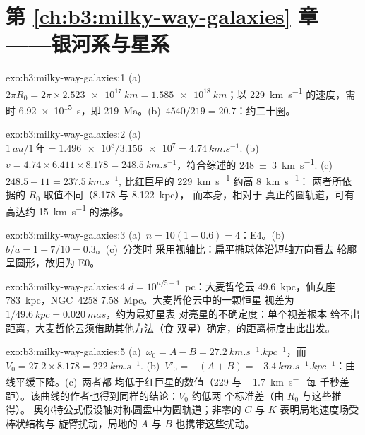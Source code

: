 \section*{第 \ref{ch:b3:milky-way-galaxies} 章——银河系与星系}

\begin{solution}{exo:b3:milky-way-galaxies:1}
(a)~$2\pi R_0 = 2\pi\times\qty{2.523e17}{km} = \qty{1.585e18}{km}$；以
\qty{229}{km.s^{-1}} 的速度，需时 \qty{6.92e15}{s}，即
\qty{219}{Ma}。(b)~$4540/219 = 20.7$：约二十圈。
\end{solution}

\begin{solution}{exo:b3:milky-way-galaxies:2}
(a)~$\qty{1}{au}/\qty{1}{\text{年}} = \num{1.496e8}/\num{3.156e7} =
\qty{4.74}{km.s^{-1}}$. (b)~$v = 4.74\times6.411\times8.178 =
\qty{248.5}{km.s^{-1}}$，符合综述的
\qty[separate-uncertainty=true]{248 \pm 3}{km.s^{-1}}. (c)~$248.5 - 11 = \qty{237.5}{km.s^{-1}}$,
比红巨星的 \qty{229}{km.s^{-1}} 约高 \qty{8}{km.s^{-1}}：
两者所依据的 $R_0$ 取值不同（8.178 与 \qty{8.122}{kpc}），
而本身，相对于
真正的圆轨道，可有高达约 \qty{15}{km.s^{-1}} 的漂移。
\end{solution}

\begin{solution}{exo:b3:milky-way-galaxies:3}
(a)~$n = 10(1 - 0.6) = 4$：E4。(b)~$b/a = 1 - 7/10 = 0.3$。(c)~分类时
采用视轴比：扁平椭球体沿短轴方向看去
轮廓呈圆形，故归为 E0。
\end{solution}

\begin{solution}{exo:b3:milky-way-galaxies:4}
$d = 10^{\mu/5 + 1}$~pc：大麦哲伦云 \qty{49.6}{kpc}，仙女座
\qty{783}{kpc}，NGC~4258 \qty{7.58}{Mpc}。大麦哲伦云中的一颗恒星
视差为 $1/\qty{49.6}{kpc} = \qty{0.020}{mas}$，约为最好星表
对亮星的不确定度：单个视差根本
给不出距离，大麦哲伦云须借助其他方法（食
双星）确定，的距离标度由此出发。
\end{solution}

\begin{solution}{exo:b3:milky-way-galaxies:5}
(a)~$\omega_0 = A - B = \qty{27.2}{km.s^{-1}.kpc^{-1}}$，而 $V_0 =
27.2\times8.178 = \qty{222}{km.s^{-1}}$. (b)~$V'_0 = -(A + B) =
\qty{-3.4}{km.s^{-1}.kpc^{-1}}$：曲线平缓下降。(c)~两者都
均低于红巨星的数值（229 与 \qty{-1.7}{km.s^{-1}} 每
千秒差距）。该曲线的作者也得到同样的结论：$V_0$ 约低两
个标准差（由 $R_0$ 与这些推得）。
奥尔特公式假设轴对称圆盘中为圆轨道；非零的 $C$ 与
$K$ 表明局地速度场受棒状结构与
旋臂扰动，局地的 $A$ 与 $B$ 也携带这些扰动。
\end{solution}

